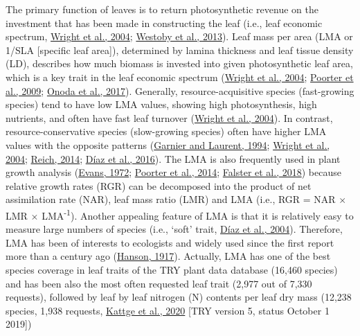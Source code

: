 \documentclass[
  12pt,
  a4paper,
,tablecaptionabove
]{scrartcl}
\begin{document}
The primary function of leaves is to return photosynthetic revenue on the investment that has been made in constructing the leaf (i.e., leaf economic spectrum, \protect\hyperlink{ref-Wright2004a}{Wright et al., 2004}; \protect\hyperlink{ref-Westoby2013}{Westoby et al., 2013}).
Leaf mass per area (LMA or 1/SLA {[}specific leaf area{]}), determined by lamina thickness and leaf tissue density (LD), describes how much biomass is invested into given photosynthetic leaf area, which is a key trait in the leaf economic spectrum (\protect\hyperlink{ref-Wright2004a}{Wright et al., 2004}; \protect\hyperlink{ref-Poorter2009}{Poorter et al., 2009}; \protect\hyperlink{ref-Onoda2017}{Onoda et al., 2017}).
Generally, resource-acquisitive species (fast-growing species) tend to have low LMA values, showing high photosynthesis, high nutrients, and often have fast leaf turnover (\protect\hyperlink{ref-Wright2004a}{Wright et al., 2004}).
In contrast, resource-conservative species (slow-growing species) often have higher LMA values with the opposite patterns (\protect\hyperlink{ref-Garnier1994}{Garnier and Laurent, 1994}; \protect\hyperlink{ref-Wright2004a}{Wright et al., 2004}; \protect\hyperlink{ref-Reich2014}{Reich, 2014}; \protect\hyperlink{ref-Diaz2016}{Díaz et al., 2016}).
The LMA is also frequently used in plant growth analysis (\protect\hyperlink{ref-Evans1972}{Evans, 1972}; \protect\hyperlink{ref-Poorter2014}{Poorter et al., 2014}; \protect\hyperlink{ref-Falster2018}{Falster et al., 2018}) because relative growth rates (RGR) can be decomposed into the product of net assimilation rate (NAR), leaf mass ratio (LMR) and LMA (i.e., RGR = NAR \(\times\) LMR \(\times\) LMA\textsuperscript{-1}).
Another appealing feature of LMA is that it is relatively easy to measure large numbers of species (i.e., `soft' trait, \protect\hyperlink{ref-Diaz2004}{Díaz et al., 2004}).
Therefore, LMA has been of interests to ecologists and widely used since the first report more than a century ago (\protect\hyperlink{ref-Hanson1917}{Hanson, 1917}).
Actually, LMA has one of the best species coverage in leaf traits of the TRY plant data database (16,460 species) and has been also the most often requested leaf trait (2,977 out of 7,330 requests), followed by leaf by leaf nitrogen (N) contents per leaf dry mass (12,238 species, 1,938 requests, \protect\hyperlink{ref-Kattge2020}{Kattge et al., 2020} {[}TRY version 5, status October 1 2019{]})
\end{document}
